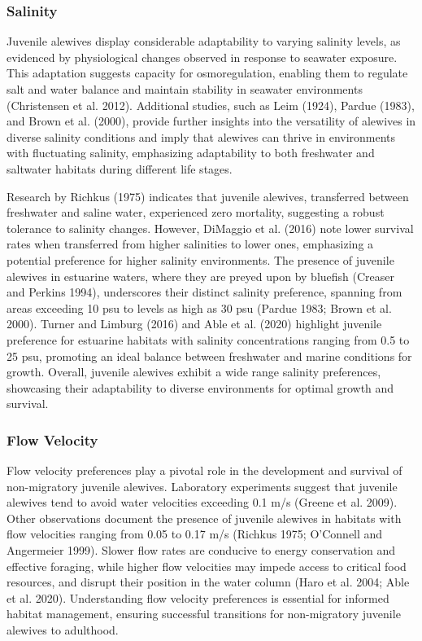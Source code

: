 \documentclass[
]{book}
\begin{document}
\hypertarget{salinity-1}{%
\subsubsection{Salinity}\label{salinity-1}}

Juvenile alewives display considerable adaptability to varying salinity levels, as evidenced by physiological changes observed in response to seawater exposure. This adaptation suggests capacity for osmoregulation, enabling them to regulate salt and water balance and maintain stability in seawater environments (Christensen et al. 2012). Additional studies, such as Leim (1924), Pardue (1983), and Brown et al. (2000), provide further insights into the versatility of alewives in diverse salinity conditions and imply that alewives can thrive in environments with fluctuating salinity, emphasizing adaptability to both freshwater and saltwater habitats during different life stages.

Research by Richkus (1975) indicates that juvenile alewives, transferred between freshwater and saline water, experienced zero mortality, suggesting a robust tolerance to salinity changes. However, DiMaggio et al. (2016) note lower survival rates when transferred from higher salinities to lower ones, emphasizing a potential preference for higher salinity environments. The presence of juvenile alewives in estuarine waters, where they are preyed upon by bluefish (Creaser and Perkins 1994), underscores their distinct salinity preference, spanning from areas exceeding 10 psu to levels as high as 30 psu (Pardue 1983; Brown et al. 2000). Turner and Limburg (2016) and Able et al. (2020) highlight juvenile preference for estuarine habitats with salinity concentrations ranging from 0.5 to 25 psu, promoting an ideal balance between freshwater and marine conditions for growth. Overall, juvenile alewives exhibit a wide range salinity preferences, showcasing their adaptability to diverse environments for optimal growth and survival.

\hypertarget{flow-velocity-1}{%
\subsubsection{Flow Velocity}\label{flow-velocity-1}}

Flow velocity preferences play a pivotal role in the development and survival of non-migratory juvenile alewives. Laboratory experiments suggest that juvenile alewives tend to avoid water velocities exceeding 0.1 m/s (Greene et al. 2009). Other observations document the presence of juvenile alewives in habitats with flow velocities ranging from 0.05 to 0.17 m/s (Richkus 1975; O'Connell and Angermeier 1999). Slower flow rates are conducive to energy conservation and effective foraging, while higher flow velocities may impede access to critical food resources, and disrupt their position in the water column (Haro et al. 2004; Able et al. 2020). Understanding flow velocity preferences is essential for informed habitat management, ensuring successful transitions for non-migratory juvenile alewives to adulthood.
\end{document}

